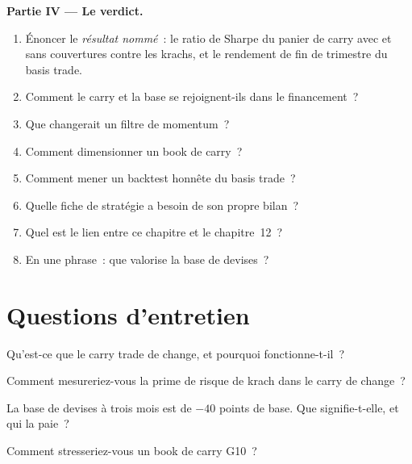\begin{problem}
\medskip\noindent\textbf{Partie IV --- Le verdict.}
\begin{enumerate}[resume]
\item Énoncer le \emph{résultat nommé}~: le ratio de Sharpe du panier de carry avec et sans couvertures contre les krachs, et le rendement de fin de trimestre du basis trade.
\item Comment le carry et la base se rejoignent-ils dans le financement~?
\item Que changerait un filtre de momentum~?
\item Comment dimensionner un book de carry~?
\item Comment mener un backtest honnête du basis trade~?
\item Quelle fiche de stratégie a besoin de son propre bilan~?
\item Quel est le lien entre ce chapitre et le chapitre~12~?
\item En une phrase~: que valorise la base de devises~?
\end{enumerate}
\end{problem}

\section{Questions d'entretien}

\begin{interviewq}\label{iq:s2:cross-currency-basis-and-fx-carry:1}
Qu'est-ce que le carry trade de change, et pourquoi fonctionne-t-il~?
\end{interviewq}

\begin{interviewq}\label{iq:s2:cross-currency-basis-and-fx-carry:2}
Comment mesureriez-vous la prime de risque de krach dans le carry de change~?
\end{interviewq}

\begin{interviewq}\label{iq:s2:cross-currency-basis-and-fx-carry:3}
La base de devises à trois mois est de $-40$ points de base. Que signifie-t-elle, et qui la paie~?
\end{interviewq}

\begin{interviewq}\label{iq:s2:cross-currency-basis-and-fx-carry:4}
Comment stresseriez-vous un book de carry G10~?
\end{interviewq}

